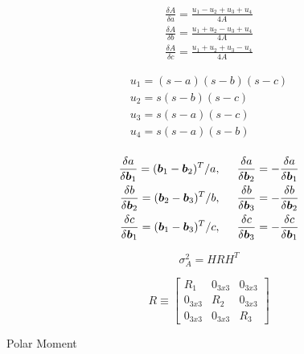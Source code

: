 \documentclass[12pt,a4paper,oneside]{article}
\begin{document}
\begin{subequations}
\begin{align*}
\frac{\delta A}{\delta a} = \frac{u_1 - u_2 + u_3 + u_4}{4A} \\
\frac{\delta A}{\delta b} = \frac{u_1 + u_2 - u_3 + u_4}{4A} \\
\frac{\delta A}{\delta c} = \frac{u_1 + u_2 + u_3 - u_4}{4A}
\end{align*}
\end{subequations}

\begin{subequations}
\begin{align*}
u_1 = (s - a)(s - b)(s - c) \\
u_2 = s(s - b)(s - c) \\
u_3 = s(s - a)(s - c) \\
u_4 = s(s - a)(s - b) \\
\end{align*}
\end{subequations}

\begin{subequations}
\begin{align*}
\frac{\delta a}{\delta \bm{b}_1} = (\bm{b}_1 - \bm{b}_2)^T /a, \hspace{0.5cm} \frac{\delta a}{\delta \bm{b}_2} = -\frac{\delta a}{\delta \bm{b}_1} \\
\frac{\delta b}{\delta \bm{b}_2} = (\bm{b}_2 - \bm{b}_3)^T /b, \hspace{0.5cm} \frac{\delta b}{\delta \bm{b}_3} = -\frac{\delta b}{\delta \bm{b}_2} \\
\frac{\delta c}{\delta \bm{b}_1} = (\bm{b}_1 - \bm{b}_3)^T /c, \hspace{0.5cm} \frac{\delta c}{\delta \bm{b}_3} = -\frac{\delta c}{\delta \bm{b}_1}
\end{align*}
\end{subequations}

\begin{equation}
\sigma_A^2 = HRH^T
\end{equation}

\begin{equation}
R \equiv \begin{bmatrix}
R_1 & 0_{3x3} & 0_{3x3} \\
0_{3x3} & R_2 & 0_{3x3} \\
0_{3x3} & 0_{3x3} & R_3
\end{bmatrix}
\end{equation}

Polar Moment
\end{document}
